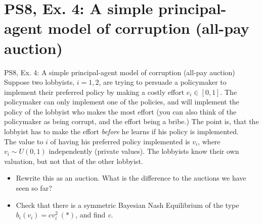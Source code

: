 \section{PS8, Ex. 4: A simple principal-agent model of corruption (all-pay auction)}

\begin{frame}{PS8, Ex. 4: A simple principal-agent model of corruption (all-pay auction)}
    Suppose two lobbyists, $i = 1, 2$, are trying to persuade a policymaker to implement their preferred policy by making a costly effort $e_i\in[0, 1]$. The policymaker can only implement one of the policies, and will implement the policy of the lobbyist who makes the most effort (you can also think of the policymaker as being corrupt, and the effort being a bribe.) The point is, that the lobbyist has to make the effort \textit{before} he learns if his policy is implemented.\\\medskip
    The value to $i$ of having his preferred policy implemented is $v_i$, where $v_i\sim U(0, 1)$ independently (private values). The lobbyists know their own valuation, but not that of the other lobbyist.
    \begin{itemize}
      \item[(a)] Rewrite this as an auction. What is the difference to the auctions we have seen so far?
      \item[(b)] Check that there is a symmetric Bayesian Nash Equilibrium of the type $b_i(v_i) = cv_i^2\ (*)$, and find \textit{c}.
    \end{itemize}
    \vfill\null
\end{frame}

